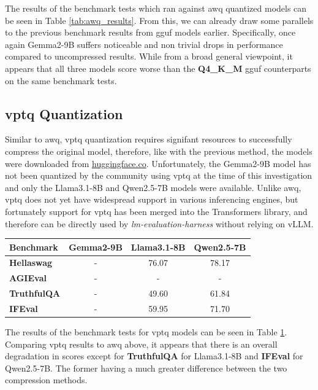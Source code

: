 \documentclass{ifacconf}
\begin{document}
	The results of the benchmark tests which ran against \gls{awq} quantized models can be seen in Table \ref{tab:awq_results}. From this, we can already draw some parallels to the previous benchmark results from \gls{gguf} models earlier. Specifically, once again Gemma2-9B suffers noticeable and non trivial drops in performance compared to uncompressed results. While from a broad general viewpoint, it appears that all three models score worse than the \textbf{Q4\_K\_M} \gls{gguf} counterparts on the same benchmark tests.
	
	\subsection{\gls{vptq} Quantization}
	Similar to \gls{awq}, \gls{vptq} quantization requires signifant resources to successfully compress the original model, therefore, like with the previous method, the models were downloaded from \url{huggingface.co}. Unfortunately, the Gemma2-9B model has not been quantized by the community using \gls{vptq} at the time of this investigation and only the Llama3.1-8B and Qwen2.5-7B models were available. Unlike \gls{awq}, \gls{vptq} does not yet have widespread support in various inferencing engines, but fortunately support for \gls{vptq} has been merged into the Transformers library, and therefore can be directly used by \textit{lm-evaluation-harness} without relying on vLLM.
	
	\begin{table}[H]
		\centering
		\begin{tabular}{|l|c|c|c|}
			\hline
			\multirow{1}{*}{\textbf{Benchmark}} & \textbf{Gemma2-9B} & \textbf{Llama3.1-8B} & \textbf{Qwen2.5-7B}  \\ \hline
			\textbf{Hellaswag}                & -            & 76.07              & 78.17              \\ \hline
			\textbf{AGIEval}                  & -            & -              & -              \\ \hline
			\textbf{TruthfulQA}               & -            & 49.60              & 61.84              \\ \hline
			\textbf{IFEval}                   & -            & 59.95              & 71.70              \\ \hline
		\end{tabular}
		\label{tab:vptq_results}
	\end{table}
	
	The results of the benchmark tests for \gls{vptq} models can be seen in Table \ref{tab:vptq_results}. Comparing \gls{vptq} results to \gls{awq} above, it appears that there is an overall degradation in scores except for \textbf{TruthfulQA} for Llama3.1-8B and \textbf{IFEval} for Qwen2.5-7B. The former having a much greater difference between the two compression methods.
	\newpage
	
\end{document}
